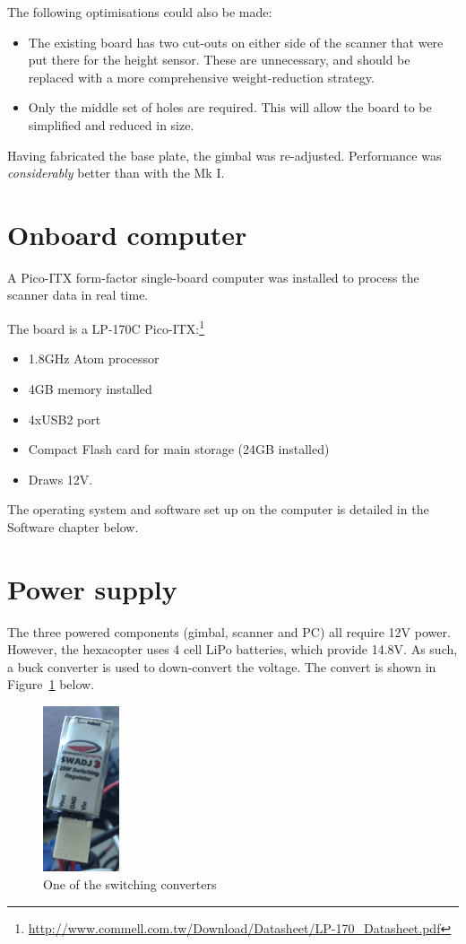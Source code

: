 \documentclass[12pt,oneside,a4paper]{book}
\begin{document}
The following optimisations could also be made:
\begin{itemize}
\item The existing board has two cut-outs on either side of the
  scanner that were put there for the height sensor. These are
  unnecessary, and should be replaced with a more comprehensive
  weight-reduction strategy.
\item Only the middle set of holes are required. This will allow the
  board to be simplified and reduced in size.
\end{itemize}

Having fabricated the base plate, the gimbal was
re-adjusted. Performance was \emph{considerably} better than with the
Mk I.
\newpage
\section{Onboard computer}
\label{sec:onboard-computer}

A Pico-ITX form-factor single-board computer was installed to process
the scanner data in real time. 

The board is a LP-170C Pico-ITX:\footnote{\url{http://www.commell.com.tw/Download/Datasheet/LP-170_Datasheet.pdf}}
\begin{itemize}
\item 1.8GHz Atom processor
\item 4GB memory installed
\item 4xUSB2 port
\item Compact Flash card for main storage (24GB installed)
\item Draws 12V.
\end{itemize}

The operating system and software set up on the computer is detailed
in the Software chapter below.
\newpage
\section{Power supply}
\label{sec:power-supply-cons}

The three powered components (gimbal, scanner and PC) all require 12V
power. However, the hexacopter uses 4 cell LiPo batteries, which
provide 14.8V. As such, a buck converter is used to down-convert the
voltage. The convert is shown in
Figure~\ref{fig:converter} below.

\begin{figure}[h!]
  \centering
  \includegraphics[width=0.2\textwidth]{figs/converter}
  \caption{One of the switching converters}
  \label{fig:converter}
\end{figure}
\end{document}

